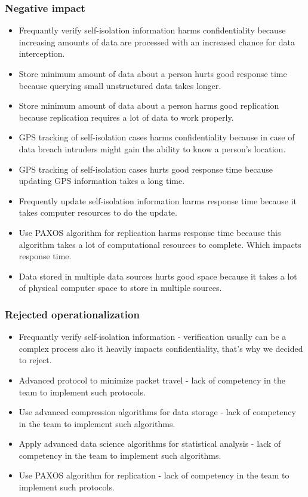 \documentclass{VUMIFPSkursinis}
\begin{document}
	\subsubsection{Negative impact}
		\begin{itemize}
			\item{Frequantly verify self-isolation information harms confidentiality because increasing amounts of data are processed with an increased chance for data interception.}
			\item{Store minimum amount of data about a person hurts good response time because querying small unstructured data takes longer.}
			\item{Store minimum amount of data about a person harms good replication because replication requires a lot of data to work properly.}
			\item{GPS tracking of self-isolation cases harms confidentiality because in case of data breach intruders might gain the ability to know  a person's location.}
			\item{GPS tracking of self-isolation cases hurts good response time because updating GPS information takes a long time.}
			\item{Frequently update self-isolation information harms response time because it takes computer resources to do the update.}
			\item{Use PAXOS algorithm for replication harms response time because this algorithm takes a lot of computational resources to complete. Which impacts response time.}
			\item{Data stored in multiple data sources hurts good space because it takes a lot of physical computer space to store in multiple sources.}
		\end{itemize}
	\subsubsection{Rejected operationalization}
		\begin{itemize}
			\item{Frequantly verify self-isolation information - verification usually can be a complex process also it heavily impacts confidentiality, that's why we decided to reject.}
			\item{Advanced protocol to minimize packet travel - lack of competency in the team to implement such protocols.}
			\item{Use advanced compression algorithms for data storage - lack of competency in the team to implement such algorithms.}
			\item{Apply advanced data science algorithms for statistical analysis - lack of competency in the team to implement such algorithms.}
			\item{Use PAXOS algorithm for replication - lack of competency in the team to implement such protocols.}
		\end{itemize}
\end{document}
